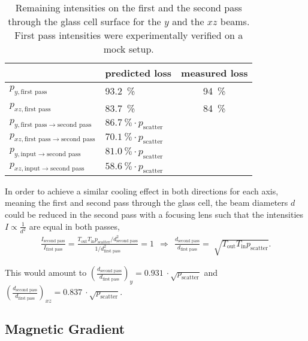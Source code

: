 \begin{table}
    \centering
    \begin{tabular}{llc}
        \toprule
        & \textbf{predicted loss} & \textbf{measured loss} \\
        \toprule
        $p_{y, \text{first pass}}$ & \SI{93.2}{\percent} & \SI{94}{\percent} \\
        $p_{xz, \text{first pass}}$ & \SI{83.7}{\percent} & \SI{84}{\percent} \\
        $p_{y, \text{first pass} \rightarrow \text{second pass}}$ & $\SI{86.7}{\percent} \cdot p_\text{scatter}$ & \\
        $p_{xz, \text{first pass} \rightarrow \text{second pass}}$ & $\SI{70.1}{\percent} \cdot p_\text{scatter}$ & \\
        $p_{y, \text{input} \rightarrow \text{second pass}}$ & $\SI{81.0}{\percent} \cdot p_\text{scatter}$ & \\
        $p_{xz, \text{input} \rightarrow \text{second pass}}$ & $\SI{58.6}{\percent} \cdot p_\text{scatter}$ & \\
        \bottomrule
    \end{tabular}
    \caption{Remaining intensities on the first and the second pass through the glass cell surface for the $y$ and the $xz$ beams. First pass intensities were experimentally verified on a mock setup.}
    \label{tab:intensity_losses}
\end{table}

In order to achieve a similar cooling effect in both directions for each axis, meaning the first and second pass through the glass cell, the beam diameters $d$ could be reduced in the second pass with a focusing lens such that the intensities $I \propto \frac{1}{d^2}$ are equal in both passes,
\begin{align}\label{eq:intensity_focusing}
\frac{I_\text{second pass}}{I_\text{first pass}} =  \frac{T_\text{out} T_\text{in} p_\text{scatter} / d^2_\text{second pass}}{1/ d^2_\text{first pass}} = 1 ~~\Rightarrow~~ \frac{d_\text{second pass}}{d_\text{first pass}} = \sqrt[]{T_\text{out} T_\text{in} p_\text{scatter}}.
\end{align}

This would amount to $\left(\frac{d_\text{second pass}}{d_\text{first pass}}\right)_y = \SI[]{0.931}{} \cdot \sqrt{p_\text{scatter}}$ and $\left(\frac{d_\text{second pass}}{d_\text{first pass}}\right)_{xz} = \SI[]{0.837}{} \cdot \sqrt{p_\text{scatter}}$.


\subsection*{Magnetic Gradient}

